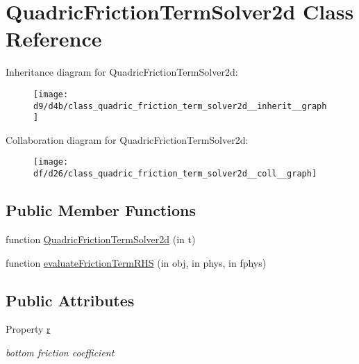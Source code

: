\hypertarget{class_quadric_friction_term_solver2d}{}\section{Quadric\+Friction\+Term\+Solver2d Class Reference}
\label{class_quadric_friction_term_solver2d}


Inheritance diagram for Quadric\+Friction\+Term\+Solver2d\+:
\nopagebreak
\begin{figure}[H]
\begin{center}
\leavevmode
\texttt{[image: d9/d4b/class\_quadric\_friction\_term\_solver2d\_\_inherit\_\_graph]}
\end{center}
\end{figure}


Collaboration diagram for Quadric\+Friction\+Term\+Solver2d\+:
\nopagebreak
\begin{figure}[H]
\begin{center}
\leavevmode
\texttt{[image: df/d26/class\_quadric\_friction\_term\_solver2d\_\_coll\_\_graph]}
\end{center}
\end{figure}
\subsection*{Public Member Functions}
\begin{DoxyCompactItemize}
\item 
function \hyperlink{class_quadric_friction_term_solver2d_a43bd58efe45e2a82c4a7659516bf4078}{Quadric\+Friction\+Term\+Solver2d} (in t)
\item 
function \hyperlink{class_quadric_friction_term_solver2d_a03c00a0f692f9d61e829a17da6ebda6d}{evaluate\+Friction\+Term\+R\+HS} (in obj, in phys, in fphys)
\end{DoxyCompactItemize}
\subsection*{Public Attributes}
\begin{DoxyCompactItemize}
\item 
Property \hyperlink{class_quadric_friction_term_solver2d_ae4bd9e4db9dc30c7d58e170668dc3f53}{r}
\begin{DoxyCompactList}\small\item\em bottom friction coefficient \end{DoxyCompactList}\end{DoxyCompactItemize}



